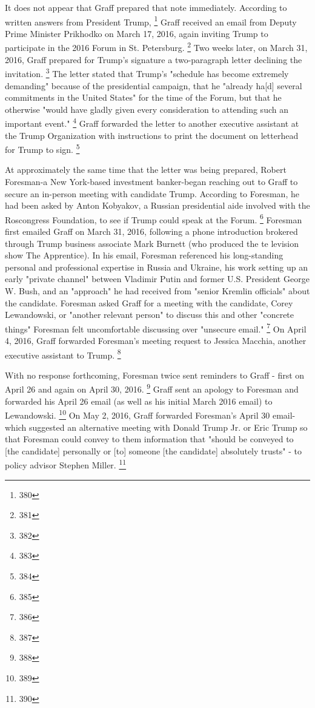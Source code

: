 It does not appear that Graff prepared that note immediately.
According to written answers from President Trump,%
\footnote{380}
Graff received an email from Deputy Prime Minister Prikhodko on March 17, 2016, again inviting Trump to participate in the 2016 Forum in St. Petersburg.%
\footnote{381}
Two weeks later, on March 31, 2016, Graff prepared for Trump's signature a two-paragraph letter declining the invitation.%
\footnote{382}
The letter stated that Trump's "schedule has become extremely demanding" because of the presidential campaign, that he "already ha[d] several commitments in the United States" for the time of the Forum, but that he otherwise "would have gladly given every consideration to attending such an important event."%
\footnote{383}
Graff forwarded the letter to another executive assistant at the Trump Organization with instructions to print the document on letterhead for Trump to sign.%
\footnote{384}

At approximately the same time that the letter was being prepared, Robert Foresman-a New York-based investment banker-began reaching out to Graff to secure an in-person meeting with candidate Trump.
According to Foresman, he had been asked by Anton Kobyakov, a Russian presidential aide involved with the Roscongress Foundation, to see if Trump could speak at the Forum.%
\footnote{385}
Foresman first emailed Graff on March 31, 2016, following a phone introduction brokered through Trump business associate Mark Burnett (who produced the te levision show The Apprentice).
In his email, Foresman referenced his long-standing personal and professional expertise in Russia and Ukraine, his work setting up an early "private channel" between Vladimir Putin and former U.S. President George W. Bush, and an "approach" he had received from "senior Kremlin officials" about the candidate.
Foresman asked Graff for a meeting with the candidate, Corey Lewandowski, or "another relevant person" to discuss this and other "concrete things" Foresman felt uncomfortable discussing over "unsecure email."%
\footnote{386}
On April 4, 2016, Graff forwarded Foresman's meeting request to Jessica Macchia, another executive assistant to Trump.%
\footnote{387}

With no response forthcoming, Foresman twice sent reminders to Graff - first on April 26 and again on April 30, 2016.%
\footnote{388}
Graff sent an apology to Foresman and forwarded his April 26 email (as well as his initial March 2016 email) to Lewandowski.%
\footnote{389}
On May 2, 2016, Graff forwarded Foresman's April 30 email-which suggested an alternative meeting with Donald Trump Jr. or Eric Trump so that Foresman could convey to them information that "should be conveyed to [the candidate] personally or [to] someone [the candidate] absolutely trusts" - to policy advisor Stephen Miller.%
\footnote{390}


